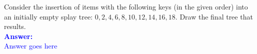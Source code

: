 \item{}
Consider the insertion of items with the following keys (in the given order)
into an initially empty splay tree: $0,2,4,6,8,10,12,14,16,18$. Draw the final
tree that results.\\[12pt]
\ifanswers
\textcolor{blue}{
\textbf{Answer:}\\[6pt]
Answer goes here
}
\newpage
\fi
